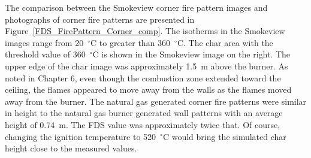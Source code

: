 \documentclass[twoside]{uocthesis}
\begin{document}
{The comparison between the Smokeview corner fire pattern images and photographs of corner fire patterns are presented in Figure~\ref{FDS_FirePattern_Corner_comp}.  The isotherms in the Smokeview images range from 20~$^\circ$C to greater than 360~$^\circ$C.  The char area with the threshold value of 360~$^\circ$C is shown in the Smokeview image on the right.  The upper edge of the char image was approximately 1.5~m above the burner.  As noted in Chapter 6, even though the combustion zone extended toward the ceiling, the flames appeared to move away from the walls as the flames moved away from the burner.  The natural gas generated corner fire patterns were similar in height to the natural gas burner generated wall patterns with an average height of 0.74~m.  The FDS value was approximately twice that.  Of course, changing the ignition temperature to 520~$^\circ$C would bring the simulated char height close to the measured values.

}
\end{document}
